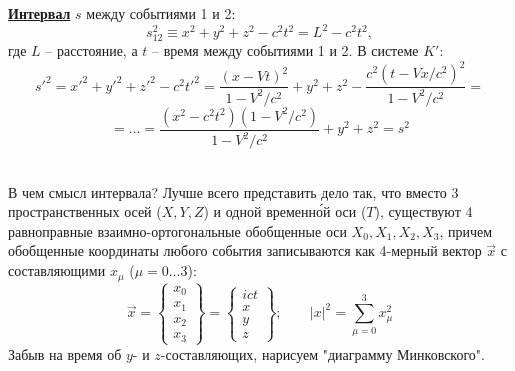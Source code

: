 \underline{\bf Интервал} $s$ между событиями 1 и 2:
\begin{displaymath}
s_{12}^2\equiv x^2+y^2+z^2-c^2t^2 = L^2-c^2t^2,
\end{displaymath}
где $L$ -- расстояние, а $t$ -- время между событиями 1 и 2. В системе $K'$:
\begin{displaymath}
s'^2=x'^2+y'^2+z'^2-c^2t'^2 =
\frac{(x-Vt)^2}{1-V^2/c^2}+y^2+z^2-
\frac{c^2(t-Vx/c^2)^2}{1-V^2/c^2}=
\end{displaymath}
\begin{displaymath}
=\ldots=
\frac{(x^2-c^2t^2)(1-V^2/c^2)}{1-V^2/c^2}+y^2+z^2=s^2
\end{displaymath}
\centerline{}
\vspace{2mm}\\
В чем смысл интервала? Лучше всего представить дело так, что вместо 3 пространственных осей ($X,Y,Z$) и одной временн\'{о}й оси ($T$), существуют 4 равноправные взаимно-ортогональные обобщенные оси $X_0,X_1,X_2,X_3$, причем обобщен\-ные координаты любого события записываются как 4-мерный вектор $\vec{x}$ с составляющими $x_\mu$ ($\mu=0\ldots3$):
\begin{equation}\label{Eq.Int}
 \vec{x}=\left\{\begin{array}{c}
                 x_0\\ x_1\\ x_2\\ x_3
                \end{array}\right\}=
\left\{\begin{array}{c}
                 ict\\ x\\ y\\ z
                \end{array}\right\};\;\;\;\;\;\;\;|x|^2 = \sum_{\mu=0}^3x_\mu^2
\end{equation}
Забыв на время об $y$- и $z$-составляющих, нарисуем "диаграмму Минковского".
\\
